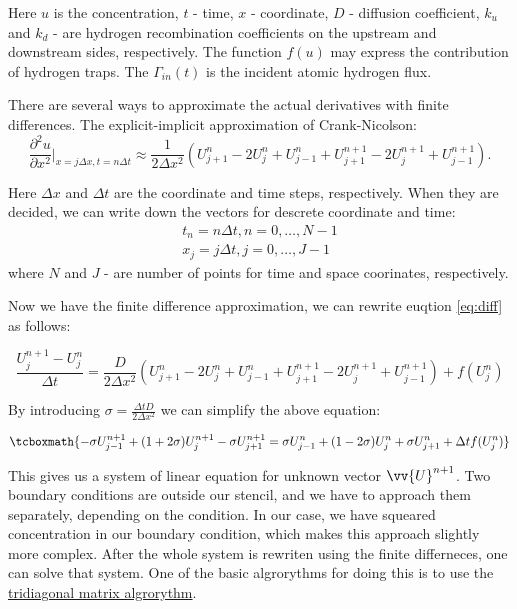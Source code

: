 \documentclass[12pt]{article}
\begin{document}
Here $u$ is the concentration, $t$ - time, $x$ - coordinate, $D$ - diffusion coefficient, $k_u$ and $k_d$ - are hydrogen recombination coefficients on the upstream and downstream sides, respectively. The function $f(u)$ may express the contribution of hydrogen traps. The $\Gamma_{in}(t)$ is the incident atomic hydrogen flux.

There are several ways to approximate the actual derivatives with finite differences. The explicit-implicit approximation of Crank-Nicolson:
\begin{equation}
\frac{\partial^2 u}{\partial x^2}\Big|_{x = j \Delta x, t = n \Delta t} \approx \frac{1}{2 \Delta x^2} \left( U_{j+1}^n - 2 U_j^n + U_{j-1}^n + U_{j+1}^{n+1} - 2 U_j^{n+1} + U_{j-1}^{n+1}\right).
\end{equation}

Here $\Delta x$ and $\Delta t$ are the coordinate and time steps, respectively. When they are decided, we can write down the vectors for descrete coordinate and time:
\begin{align}
    t_n = n\Delta t, n = 0, \dots, N-1\\
    x_j = j\Delta t, j = 0, \dots, J-1
\end{align}
where $N$ and $J$ - are number of points for time and space coorinates, respectively.

Now we have the finite difference approximation, we can rewrite euqtion \ref{eq:diff} as follows:

\begin{equation}
    \frac{U_{j}^{n+1}-U_{j}^{n}}{\Delta t} = \frac{D}{2\Delta x^2}\left( U_{j+1}^n - 2 U_j^n + U_{j-1}^n + U_{j+1}^{n+1} - 2 U_j^{n+1} + U_{j-1}^{n+1}\right) + f(U_{j}^{n})
\end{equation}

By introducing $\sigma = \frac{\Delta t D}{2\Delta x^2}$ we can simplify the above equation:

\begin{equation}
    \tcboxmath{
    -\sigma U_{j-1}^{n+1} + (1+2\sigma)U_{j}^{n+1} - \sigma U_{j+1}^{n+1} = \sigma U_{j-1}^{n} + (1-2\sigma) U_{j}^{n} + \sigma U_{j+1}^{n} + \Delta t f(U_{j}^{n})
    }
\end{equation}

This gives us a system of linear equation for unknown vector $\vv{U}^{n+1}$. Two boundary conditions are outside our stencil, and we have to approach them separately, depending on the condition. In our case, we have squeared concentration in our boundary condition, which makes this approach slightly more complex. After the whole system is rewriten using the finite differneces, one can solve that system. One of the basic algrorythms for doing this is to use the \href{https://en.wikipedia.org/wiki/Tridiagonal_matrix_algorithm}{tridiagonal matrix algrorythm}.
\end{document}
